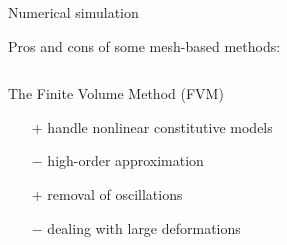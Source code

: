 \begin{frame}{Numerical simulation}
\begin{block}{Pros and cons of some mesh-based methods:}
\begin{scriptsize}
\begin{columns}
\begin{column}{.45\textwidth}
\begin{block}{\scriptsize The Finite Volume Method (FVM)}
\begin{itemize}
            \item[$+$] handle nonlinear constitutive models
            \item[$-$] high-order approximation
            \item[$+$] removal of oscillations
            \item[$-$] dealing with large deformations
            \end{itemize}
          \end{block}
        \end{column}
      \end{columns}
    \end{scriptsize}
  \end{block}
\end{frame}

